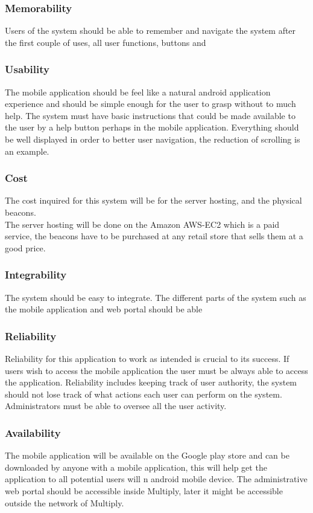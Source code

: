 \documentclass[11pt]{article}
\begin{document}
\subsubsection{Memorability}
Users of the system should be able to remember and navigate the system after the first couple of uses, all user functions, buttons and   
\subsubsection{Usability}
The mobile application should be feel like a natural android application experience and should be simple enough for the user to grasp without to much help. The system must have basic instructions that could be made available to the user by a help button perhaps in the mobile application. Everything should be well displayed in order to better user navigation, the reduction of scrolling is an example.
\subsubsection{Cost}
The cost inquired for this system will be for the server hosting, and the physical beacons.\\
The server hosting will be done on the Amazon AWS-EC2 which is a paid service, the beacons have to be purchased at any retail store that sells them at a good price.

\subsubsection{Integrability}
The system should be easy to integrate. The different parts of the system such as the mobile application and web portal should be able   
\subsubsection{Reliability}
Reliability for this application to work as intended is crucial to its success. If users wish to access the mobile application the user must be always able to access the application. Reliability includes keeping track of user authority, the system should not lose track of what actions each user can perform on the system. Administrators must be able to oversee all the user activity.
\subsubsection{Availability}
The mobile application will be available on the Google play store and can be downloaded by anyone with a mobile application, this will help get the application to all potential users will n android mobile device. The administrative web portal should be accessible inside Multiply, later it might be accessible outside the network of Multiply.
\end{document}

